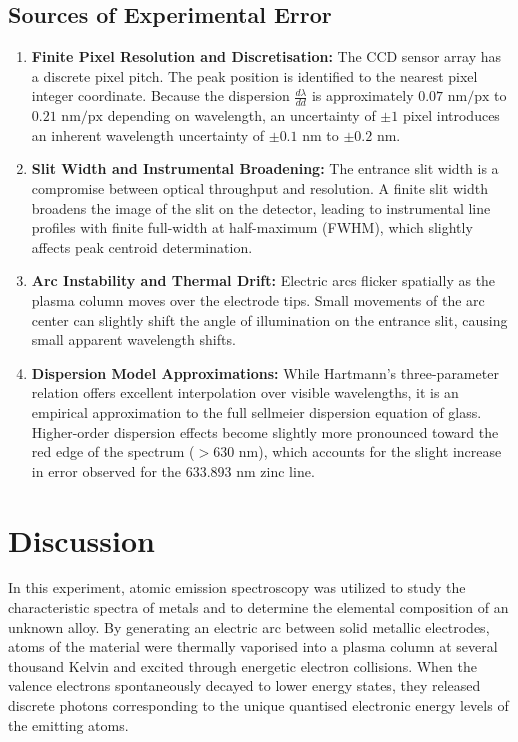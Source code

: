 \documentclass[12pt, a4paper]{article}
\begin{document}
\subsection{Sources of Experimental Error}
\begin{enumerate}
    \item \textbf{Finite Pixel Resolution and Discretisation:} The CCD sensor array has a discrete pixel pitch. The peak position is identified to the nearest pixel integer coordinate. Because the dispersion $\frac{d\lambda}{dd}$ is approximately $0.07\text{ nm/px}$ to $0.21\text{ nm/px}$ depending on wavelength, an uncertainty of $\pm 1$ pixel introduces an inherent wavelength uncertainty of $\pm 0.1\text{ nm}$ to $\pm 0.2\text{ nm}$.
    \item \textbf{Slit Width and Instrumental Broadening:} The entrance slit width is a compromise between optical throughput and resolution. A finite slit width broadens the image of the slit on the detector, leading to instrumental line profiles with finite full-width at half-maximum (FWHM), which slightly affects peak centroid determination.
    \item \textbf{Arc Instability and Thermal Drift:} Electric arcs flicker spatially as the plasma column moves over the electrode tips. Small movements of the arc center can slightly shift the angle of illumination on the entrance slit, causing small apparent wavelength shifts.
    \item \textbf{Dispersion Model Approximations:} While Hartmann's three-parameter relation offers excellent interpolation over visible wavelengths, it is an empirical approximation to the full sellmeier dispersion equation of glass. Higher-order dispersion effects become slightly more pronounced toward the red edge of the spectrum ($> 630\text{ nm}$), which accounts for the slight increase in error observed for the 633.893 nm zinc line.
\end{enumerate}

\section{Discussion}
In this experiment, atomic emission spectroscopy was utilized to study the characteristic spectra of metals and to determine the elemental composition of an unknown alloy. By generating an electric arc between solid metallic electrodes, atoms of the material were thermally vaporised into a plasma column at several thousand Kelvin and excited through energetic electron collisions. When the valence electrons spontaneously decayed to lower energy states, they released discrete photons corresponding to the unique quantised electronic energy levels of the emitting atoms. 
\end{document}
